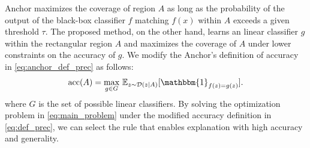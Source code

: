 \documentclass[11pt]{article}
\begin{document}
Anchor maximizes the coverage of region $A$
as long as the probability of the output of the black-box classifier $f$ matching $f(x)$
within $A$ exceeds a given threshold $\tau$.
The proposed method, on the other hand, learns an linear classifier $g$
within the rectangular region $A$ and maximizes the coverage of $A$
under lower constraints on the accuracy of $g$.
We modify the Anchor's definition of accuracy in \cref{eq:anchor_def_prec}
as follows:
\begin{equation}
  \Prec(A)=\underset{g\in G}{\max}\ \mathbb{E}_{z\sim\mathcal{D}(z|A)}
  [\mathbbm{1}_{f(z)=g(z)}]. \label{eq:def_prec}
\end{equation}
where $G$ is the set of possible linear classifiers.
By solving the optimization problem in \cref{eq:main_problem}
under the modified accuracy definition in \cref{eq:def_prec},
we can select the rule that enables explanation with high accuracy and generality.
\end{document}
